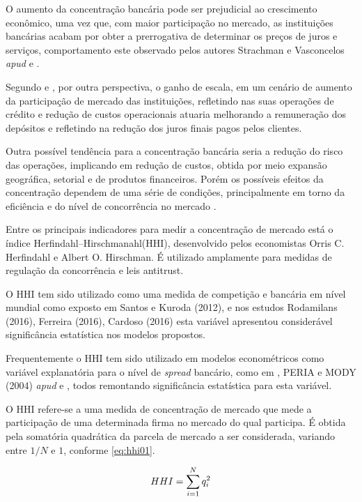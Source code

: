 \documentclass[
  12pt,
  12pt,
  openright,
  oneside,
  a4paper,
  chapter=TITLE,
  section=TITLE,
  subsection=TITLE,
  subsubsection=TITLE,
  english,
  portugues,
  sumario=tradicional]{abntex2}
\begin{document}
O aumento da concentração bancária pode ser prejudicial ao crescimento econômico, uma vez que, com maior participação no mercado, as instituições bancárias acabam por obter a prerrogativa de determinar os preços de juros e serviços, comportamento este observado pelos autores Strachman e Vasconcelos \emph{apud} \textcite{camargo:2009} e \textcite{klein:1971}.

Segundo \textcite{camargo:2009} e \textcite{dantas:2012}, por outra perspectiva, o ganho de escala, em um cenário de aumento da participação de mercado das instituições, refletindo nas suas operações de crédito e redução de custos operacionais atuaria melhorando a remuneração dos depósitos e refletindo na redução dos juros finais pagos pelos clientes.

Outra possível tendência para a concentração bancária seria a redução do risco
das operações, implicando em redução de custos, obtida por meio expansão
geográfica, setorial e de produtos financeiros. Porém os possíveis efeitos da
concentração dependem de uma série de condições, principalmente em torno da
eficiência e do nível de concorrência no mercado \cite{camargo:2009}.

Entre os principais indicadores para medir a concentração de mercado está o índice Herfindahl--Hirschmanahl(HHI), desenvolvido pelos economistas Orris C. Herfindahl e Albert O. Hirschman. É utilizado amplamente para medidas de regulação da concorrência e leis antitrust.

O HHI tem sido utilizado como uma medida de competição e bancária em nível mundial como exposto em Santos e Kuroda (2012), e nos estudos Rodamilans (2016), Ferreira (2016), Cardoso (2016) esta variável apresentou considerável significância estatística nos modelos propostos.

Frequentemente o HHI tem sido utilizado em modelos econométricos como variável explanatória para o nível de \emph{spread} bancário, como em \textcite{dantas:2012}, PERIA e MODY (2004) \emph{apud} \textcite{leal:2006} e \textcite{almeida:2013}, todos remontando significância estatística para esta variável.

O HHI refere-se a uma medida de concentração de mercado que mede a participação de uma determinada firma no mercado do qual participa. É obtida pela somatória quadrática da parcela de mercado a ser considerada, variando entre \(1/N\) e \(1\), conforme \autoref{eq:hhi01}.

\begin{equation}\label{eq:hhi01}
HHI = \sum_{i=1}^{N}q_i^2
\vspace{10pt}
\end{equation}
\end{document}
